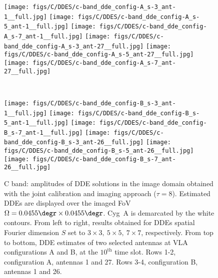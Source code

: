 \begin{figure*}
\begin{minipage}[t]{1\linewidth}
\centering
\texttt{[image: figs/C/DDES/c-band\_dde\_config-A\_s-3\_ant-1\_\_full.jpg]}
\texttt{[image: figs/C/DDES/c-band\_dde\_config-A\_s-5\_ant-1\_\_full.jpg]}
\texttt{[image: figs/C/DDES/c-band\_dde\_config-A\_s-7\_ant-1\_\_full.jpg]}
\texttt{[image: figs/C/DDES/c-band\_dde\_config-A\_s-3\_ant-27\_\_full.jpg]}
\texttt{[image: figs/C/DDES/c-band\_dde\_config-A\_s-5\_ant-27\_\_full.jpg]}
\texttt{[image: figs/C/DDES/c-band\_dde\_config-A\_s-7\_ant-27\_\_full.jpg]}
\end{minipage}
~\\
\begin{minipage}[t]{1\linewidth}\centering
\texttt{[image: figs/C/DDES/c-band\_dde\_config-B\_s-3\_ant-1\_\_full.jpg]}
\texttt{[image: figs/C/DDES/c-band\_dde\_config-B\_s-5\_ant-1\_\_full.jpg]}
\texttt{[image: figs/C/DDES/c-band\_dde\_config-B\_s-7\_ant-1\_\_full.jpg]}
\texttt{[image: figs/C/DDES/c-band\_dde\_config-B\_s-3\_ant-26\_\_full.jpg]}
\texttt{[image: figs/C/DDES/c-band\_dde\_config-B\_s-5\_ant-26\_\_full.jpg]}
\texttt{[image: figs/C/DDES/c-band\_dde\_config-B\_s-7\_ant-26\_\_full.jpg]}
\end{minipage}
\caption{{C band: amplitudes of DDE solutions in the image domain obtained with the joint calibration and imaging approach ($\tau =8$). Estimated DDEs are displayed over the imaged FoV $\Omega= 0.0455\degr \times 0.0455\degr$. Cyg~A is demarcated by the white contours. From left to right, results obtained for DDEs spatial Fourier dimension $S$ set to $3\times 3,~5\times 5,~ 7\times 7$, respectively. From top to bottom, DDE estimates of two selected antennas at VLA configurations A and B, at {the $10^{\textrm{th}}$} time slot. Rows 1-2, configuration A, antennas 1 and 27.  Rows 3-4, configuration B, antennas 1 and 26. }}
\label{fig:c_dde_solutions_full1}

\end{figure*}
